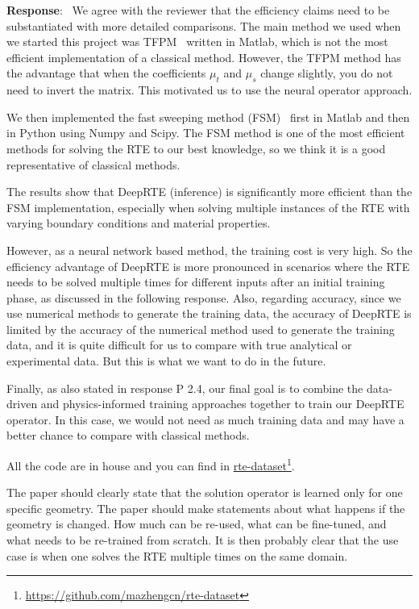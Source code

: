 \documentclass[12pt]{article}
\newcounter{reviewer}
\newcounter{point}[reviewer]
\renewcommand{\thepoint}{P\,\thereviewer.\arabic{point}}
\newenvironment{point}{\refstepcounter{point} \bigskip \noindent {\textbf{[Reviewer~Point~\thepoint]} }  }{\par }
\newenvironment{reply}{\medskip \noindent \textbf{Response}:\  \color{blue}\ignorespaces}{\medskip}
\begin{document}
\begin{reply}
	We agree with the reviewer that the efficiency claims need to be substantiated with more detailed comparisons. The main method we used when we started this project was TFPM~\cite{fu2024fast} written in Matlab, which is not the most efficient implementation of a classical method. However, the TFPM method has the advantage that when the coefficients $\mu_t$ and $\mu_s$ change slightly, you do not need to invert the matrix. This motivated us to use the neural operator approach.

	We then implemented the fast sweeping method (FSM)~\cite{gao2009fast} first in Matlab and then in Python using Numpy and Scipy. The FSM method is one of the most efficient methods for solving the RTE to our best knowledge, so we think it is a good representative of classical methods.

	The results show that DeepRTE (inference) is significantly more efficient than the FSM implementation, especially when solving multiple instances of the RTE with varying boundary conditions and material properties.

	However, as a neural network based method, the training cost is very high. So the efficiency advantage of DeepRTE is more pronounced in scenarios where the RTE needs to be solved multiple times for different inputs after an initial training phase, as discussed in the following response. Also, regarding accuracy, since we use numerical methods to generate the training data, the accuracy of DeepRTE is limited by the accuracy of the numerical method used to generate the training data, and it is quite difficult for us to compare with true analytical or experimental data. But this is what we want to do in the future.

	Finally, as also stated in response P 2.4, our final goal is to combine the data-driven and physics-informed training approaches together to train our DeepRTE operator. In this case, we would not need as much training data and may have a better chance to compare with classical methods.

	All the code are in house and you can find in \href{https://github.com/mazhengcn/rte-dataset}{rte-dataset}\footnote{ \url{https://github.com/mazhengcn/rte-dataset}}.
\end{reply}

\begin{point}
	The paper should clearly state that the solution operator is learned only for one specific geometry. The paper should make statements about what happens if the geometry is changed. How much can be re-used, what can be fine-tuned, and what needs to be re-trained from scratch. It is then probably clear that the use case is when one solves the RTE multiple times on the same domain.
\end{point}
\end{document}

